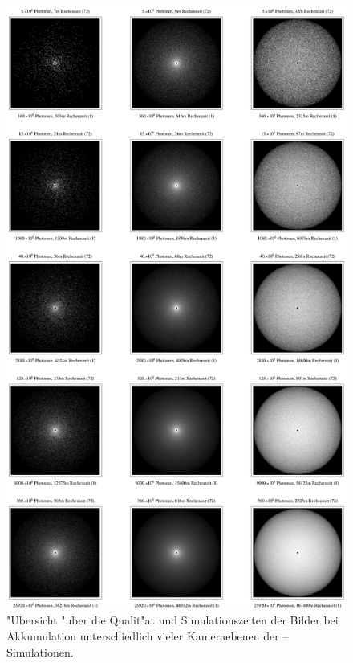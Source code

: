 		\begin{figure}
			\centering
			\includegraphics[height=1.0\textheight]{mc3dsphereimageoverview.eps}
			\caption{"Ubersicht "uber die Qualit"at und Simulationszeiten der Bilder bei Akkumulation unterschiedlich vieler Kameraebenen der \mctd--Simulationen.}
			\label{fig:mc3d_sphere_imageoverview}
		\end{figure}
